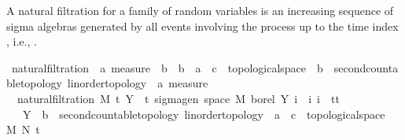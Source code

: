 \begin{isabellebody}
{\isafoldproof}%
%
\isadelimproof
%
\endisadelimproof
%
\isadelimdocument
%
\endisadelimdocument
%
\isatagdocument
%
\isamarkuptrue%
%
\endisatagdocument
{\isafolddocument}%
%
\isadelimdocument
%
\endisadelimdocument
%
\begin{isamarkuptext}%
A natural filtration for a family of random variables  is an increasing sequence of sigma algebras generated by all events involving the process up to the time index , i.e., .%
\end{isamarkuptext}\isamarkuptrue%
\isamarkupfalse%
\ natural{\isacharunderscore}{\kern0pt}filtration\ {\isacharcolon}{\kern0pt}{\isacharcolon}{\kern0pt}\ {\isachardoublequoteopen}{\isacharprime}{\kern0pt}a\ measure\ {\isasymRightarrow}\ {\isacharprime}{\kern0pt}b\ {\isasymRightarrow}\ {\isacharparenleft}{\kern0pt}{\isacharprime}{\kern0pt}b\ {\isasymRightarrow}\ {\isacharprime}{\kern0pt}a\ {\isasymRightarrow}\ {\isacharprime}{\kern0pt}c\ {\isacharcolon}{\kern0pt}{\isacharcolon}{\kern0pt}\ topological{\isacharunderscore}{\kern0pt}space{\isacharparenright}{\kern0pt}\ {\isasymRightarrow}\ {\isacharprime}{\kern0pt}b\ {\isacharcolon}{\kern0pt}{\isacharcolon}{\kern0pt}\ {\isacharbraceleft}{\kern0pt}second{\isacharunderscore}{\kern0pt}countable{\isacharunderscore}{\kern0pt}topology{\isacharcomma}{\kern0pt}\ linorder{\isacharunderscore}{\kern0pt}topology{\isacharbraceright}{\kern0pt}\ {\isasymRightarrow}\ {\isacharprime}{\kern0pt}a\ measure{\isachardoublequoteclose}\ \isanewline
\ \ {\isachardoublequoteopen}natural{\isacharunderscore}{\kern0pt}filtration\ M\ t\ Y\ {\isacharequal}{\kern0pt}\ {\isacharparenleft}{\kern0pt}{\isasymlambda}t{\isachardot}{\kern0pt}\ sigma{\isacharunderscore}{\kern0pt}gen\ {\isacharparenleft}{\kern0pt}space\ M{\isacharparenright}{\kern0pt}\ borel\ {\isacharbraceleft}{\kern0pt}Y\ i\ {\isacharbar}{\kern0pt}\ i{\isachardot}{\kern0pt}\ i\ {\isasymin}\ {\isacharbraceleft}{\kern0pt}tt{\isacharbraceright}{\kern0pt}{\isacharbraceright}{\kern0pt}{\isacharparenright}{\kern0pt}{\isachardoublequoteclose}\isanewline
\isanewline
{}\isamarkupfalse%
\isanewline
\ \ \ Y\ {\isacharcolon}{\kern0pt}{\isacharcolon}{\kern0pt}\ {\isachardoublequoteopen}{\isacharprime}{\kern0pt}b\ {\isacharcolon}{\kern0pt}{\isacharcolon}{\kern0pt}\ {\isacharbraceleft}{\kern0pt}second{\isacharunderscore}{\kern0pt}countable{\isacharunderscore}{\kern0pt}topology{\isacharcomma}{\kern0pt}\ linorder{\isacharunderscore}{\kern0pt}topology{\isacharbraceright}{\kern0pt}\ {\isasymRightarrow}\ {\isacharprime}{\kern0pt}a\ {\isasymRightarrow}\ {\isacharprime}{\kern0pt}c\ {\isacharcolon}{\kern0pt}{\isacharcolon}{\kern0pt}\ topological{\isacharunderscore}{\kern0pt}space{\isachardoublequoteclose}\ \ M\ N\ t\isanewline

\end{isabellebody}
